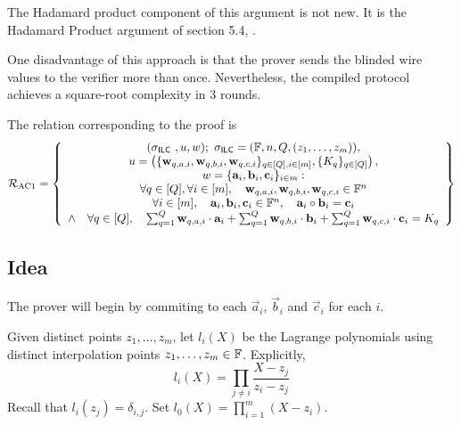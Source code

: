 The Hadamard product component of this argument is not new. It is the Hadamard Product argument of section 5.4, \cite{Bayer2014}.

One disadvantage of this approach is that the prover sends the blinded wire values to the verifier more than once. Nevertheless, the compiled protocol achieves a square-root complexity in 3 rounds.

The relation corresponding to the proof is
\[
\mathcal{R}_{\textnormal{AC1}}=\left\{\begin{array}{c}
(\mathsf{\sigma}_{\mathsf{ILC}~},u,w); \ \mathsf{\sigma}_{\mathsf{ILC}} = (\mathbb{F},n,Q,(z_1,\ldots,z_m)), \\
u = \left( \{\mathbf{w}_{q,{a,i}},\mathbf{w}_{q,{b,i}},\mathbf{w}_{q,{c,i}}\}_{q \in [Q], i \in [m]}, \{K_{q}\}_{q \in [Q]}\right), \\
w = \{\mathbf{a}_i,\mathbf{b}_i,\mathbf{c}_i\}_{i \in m}:\\
\forall q \in [Q], \forall i \in [m], \quad \mathbf{w}_{q,a,i}, \mathbf{w}_{q,b,i}, \mathbf{w}_{q,c,i} \in \mathbb{F}^n \\
\forall i \in [m], \quad \mathbf{a}_i,\mathbf{b}_i,\mathbf{c}_i \in \mathbb{F}^n, \quad \mathbf{a}_i \circ \mathbf{b}_i=\mathbf{c}_i \\
\wedge \quad \forall q \in [Q], \quad \sum_{q=1}^Q \mathbf{w}_{q,a,i} \cdot \mathbf{a}_i + \sum_{q=1}^Q \mathbf{w}_{q,b,i} \cdot \mathbf{b}_i + \sum_{q=1}^Q \mathbf{w}_{q,c,i} \cdot \mathbf{c}_i = K_q
\end{array}\right\}
\]

\subsection{Idea}

The prover will begin by commiting to each $\vec{a}_{i}$, $\vec{b}_i$ and $\vec{c}_i$ for each $i$.

Given distinct points $z_1,\ldots,z_m$, let $l_i(X)$ be the Lagrange polynomials using distinct interpolation points $z_1,\ldots,z_m \in \mathbb{F}$. Explicitly, $$l_i(X) = \prod_{j \neq i} \frac{X-z_j}{z_i - z_j}$$ Recall that $l_i(z_j)=\delta_{i,j}$. Set $l_0(X) = \prod_{i=1}^m (X-z_i)$. 

